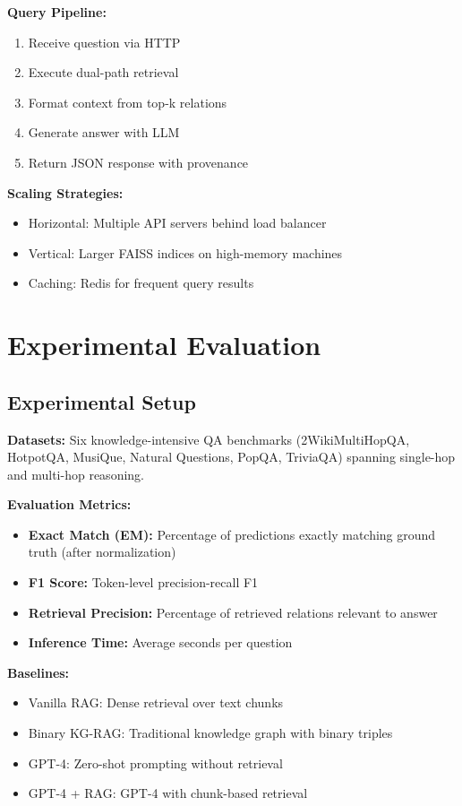 \documentclass[11pt,a4paper]{article}
\begin{document}
\textbf{Query Pipeline:}
\begin{enumerate}
    \item Receive question via HTTP
    \item Execute dual-path retrieval
    \item Format context from top-k relations
    \item Generate answer with LLM
    \item Return JSON response with provenance
\end{enumerate}

\textbf{Scaling Strategies:}
\begin{itemize}
    \item Horizontal: Multiple API servers behind load balancer
    \item Vertical: Larger FAISS indices on high-memory machines
    \item Caching: Redis for frequent query results
\end{itemize}

\section{Experimental Evaluation}

\subsection{Experimental Setup}

\textbf{Datasets:} Six knowledge-intensive QA benchmarks (2WikiMultiHopQA, HotpotQA, MusiQue, Natural Questions, PopQA, TriviaQA) spanning single-hop and multi-hop reasoning.

\textbf{Evaluation Metrics:}
\begin{itemize}
    \item \textbf{Exact Match (EM):} Percentage of predictions exactly matching ground truth (after normalization)
    \item \textbf{F1 Score:} Token-level precision-recall F1
    \item \textbf{Retrieval Precision:} Percentage of retrieved relations relevant to answer
    \item \textbf{Inference Time:} Average seconds per question
\end{itemize}

\textbf{Baselines:}
\begin{itemize}
    \item Vanilla RAG: Dense retrieval over text chunks
    \item Binary KG-RAG: Traditional knowledge graph with binary triples
    \item GPT-4: Zero-shot prompting without retrieval
    \item GPT-4 + RAG: GPT-4 with chunk-based retrieval
\end{itemize}
\end{document}
